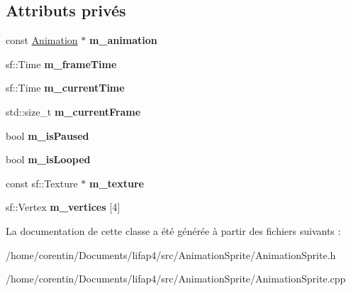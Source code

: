\subsection*{Attributs privés}
\begin{DoxyCompactItemize}
\item 
\mbox{\label{class_animated_sprite_afd9382a05230debb398d514a071dde7f}} 
const \hyperlink{class_animation}{Animation} $\ast$ {\bfseries m\+\_\+animation}
\item 
\mbox{\label{class_animated_sprite_afce08b67e38c971bd1b5ad7f6a554c6d}} 
sf\+::\+Time {\bfseries m\+\_\+frame\+Time}
\item 
\mbox{\label{class_animated_sprite_ab87ffbc20845fe5a385aa54bcd5474e1}} 
sf\+::\+Time {\bfseries m\+\_\+current\+Time}
\item 
\mbox{\label{class_animated_sprite_ab8b8a4ffdfb805d1398df75c75a6968c}} 
std\+::size\+\_\+t {\bfseries m\+\_\+current\+Frame}
\item 
\mbox{\label{class_animated_sprite_a5254968002ee38358d213d0635bc850c}} 
bool {\bfseries m\+\_\+is\+Paused}
\item 
\mbox{\label{class_animated_sprite_a4f9785ba745693bfcb8c184fe106e03a}} 
bool {\bfseries m\+\_\+is\+Looped}
\item 
\mbox{\label{class_animated_sprite_a817156ebd0f7867a89352a6e94717af5}} 
const sf\+::\+Texture $\ast$ {\bfseries m\+\_\+texture}
\item 
\mbox{\label{class_animated_sprite_a27a110055fb89389a0e3d523ebd49738}} 
sf\+::\+Vertex {\bfseries m\+\_\+vertices} \mbox{[}4\mbox{]}
\end{DoxyCompactItemize}


La documentation de cette classe a été générée à partir des fichiers suivants \+:\begin{DoxyCompactItemize}
\item 
/home/corentin/\+Documents/lifap4/src/\+Animation\+Sprite/Animation\+Sprite.\+h\item 
/home/corentin/\+Documents/lifap4/src/\+Animation\+Sprite/Animation\+Sprite.\+cpp\end{DoxyCompactItemize}
